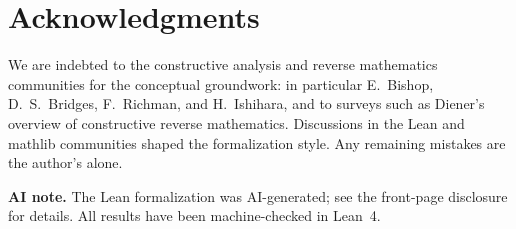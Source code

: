 \documentclass[11pt]{article}
\begin{document}
\section*{Acknowledgments}

We are indebted to the constructive analysis and reverse mathematics communities for the conceptual groundwork: in particular E.~Bishop, D.~S.~Bridges, F.~Richman, and H.~Ishihara, and to surveys such as Diener's overview of constructive reverse mathematics. Discussions in the Lean and mathlib communities shaped the formalization style. Any remaining mistakes are the author's alone.

\smallskip
\noindent\textbf{AI note.} The Lean formalization was AI-generated; see the front-page disclosure for details. All results have been machine-checked in Lean~4.
\end{document}
